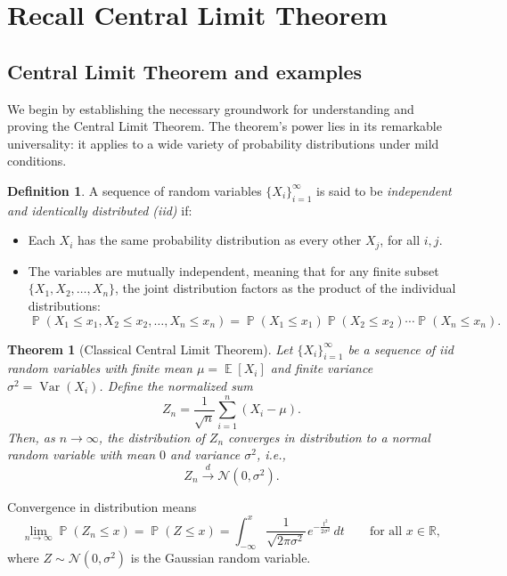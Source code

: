 \documentclass[letterpaper,11pt,oneside,reqno]{book}
\numberwithin{equation}{chapter}  %
\newcommand{\ssp}{\hspace{1pt}}
\newtheorem{theorem}[proposition]{Theorem}
\theoremstyle{definition}
\newtheorem{definition}[proposition]{Definition}
\begin{document}
\section{Recall Central Limit Theorem}

\subsection{Central Limit Theorem and examples}

We begin by establishing the necessary groundwork for understanding and proving
the Central Limit Theorem. The theorem's power lies in its remarkable universality:
it applies to a wide variety of probability distributions under mild conditions.

\begin{definition}
A sequence of random variables $\{X_i\}_{i=1}^{\infty}$ is said to be
\emph{independent and identically distributed (iid)}
if:

\begin{itemize}
    \item Each $X_i$ has the same probability distribution as every other $X_j$, for all $i, j$.
    \item The variables are mutually independent, meaning that for any finite subset $\{X_1, X_2, \dots, X_n\}$, the joint distribution factors as the product of the individual distributions:
    \[
			\operatorname{\mathbb{P}}(X_1 \leq x_1, X_2 \leq x_2, \dots, X_n \leq x_n)
			=
			\operatorname{\mathbb{P}}(X_1 \leq x_1)
			\operatorname{\mathbb{P}}(X_2 \leq x_2) \cdots \operatorname{\mathbb{P}}(X_n \leq x_n).
    \]
\end{itemize}
\end{definition}

\begin{theorem}[Classical Central Limit Theorem]
	Let $\{X_i\}_{i=1}^{\infty}$ be a sequence of iid random variables with finite mean $\mu = \operatorname{\mathbb{E}}[X_i]$ and finite
	variance $\sigma^2 = \operatorname{\mathrm{Var}}(X_i)$.
	Define the normalized sum
\begin{equation}
	\label{lecture1:eq:normalized-sum}
	Z_n = \frac{1}{\sqrt{n}} \sum_{i=1}^n \left(X_i - \mu\right).
\end{equation}
Then, as $n \to \infty$, the distribution of $Z_n$ converges in distribution to a normal random variable with mean $0$ and variance $\sigma^2$, i.e.,
\[
Z_n \xrightarrow{d} \mathcal{N}(0, \sigma^2).
\]
\end{theorem}
Convergence in distribution means
\begin{equation}
	\label{lecture1:eq:conv-in-dist}
	\lim_{n \to \infty} \operatorname{\mathbb{P}}(Z_n \leq x) = \operatorname{\mathbb{P}}(Z \leq x)
		= \int_{-\infty}^x \frac{1}{\sqrt{2\pi \sigma^2}}\ssp e^{-\frac{t^2}{2\sigma^2}} \, dt
	\qquad
	\text{for all } x \in \mathbb{R},
\end{equation}
where $Z \sim \mathcal{N}(0, \sigma^2)$ is the Gaussian random variable.
\end{document}
